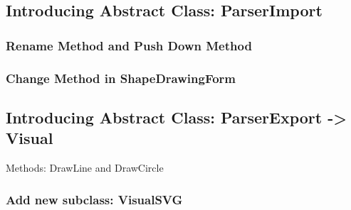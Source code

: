 \documentclass[a4paper,12pt]{article}
\begin{document}
\subsection{Introducing Abstract Class: ParserImport}

\subsubsection{Rename Method and Push Down Method}

\subsubsection{Change Method in ShapeDrawingForm}

\subsection{Introducing Abstract Class: ParserExport -> Visual}
Methods: DrawLine and DrawCircle

\subsubsection{Add new subclass: VisualSVG}
\end{document}
